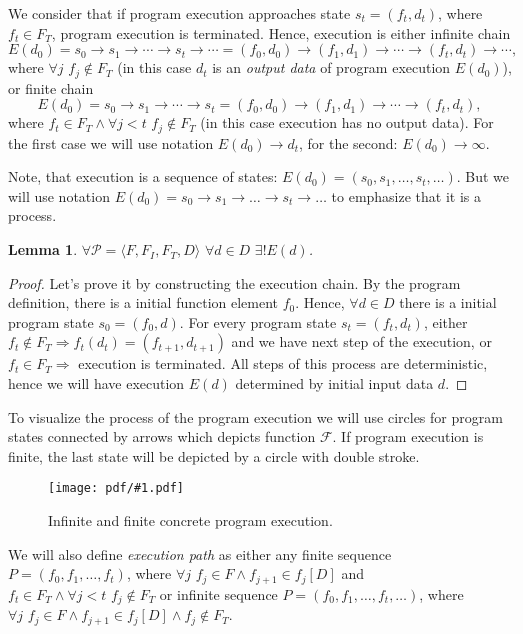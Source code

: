 \documentclass[oneside,a4paper]{article}  %
\newcommand{\Ra}{\Rightarrow}
\newcommand{\ra}{\rightarrow}
\newcommand{\term}[1]{\textit{#1}\index{#1}}
\newcommand{\centerimage}[2]{
\begin{figure}[h!]
    \begin{center}
        \texttt{[image: pdf/\#1.pdf]}
        \caption{#2}
    \end{center}
    \label{img:#1}
\end{figure}
}
\newtheorem{lemma}[theorem]{Lemma}
\begin{document}
We consider that if program execution approaches state $s_t = (f_t, d_t)$,
where $f_t \in F_T$, program execution is terminated.
Hence, execution is either infinite chain
\[E(d_0) = s_0 \ra s_1 \ra \cdots \ra s_t \ra \cdots =
        (f_0, d_0) \ra (f_1, d_1) \ra \cdots \ra (f_t, d_t) \ra \cdots,\]
where $\forall j \,\, f_j \notin F_T$ (in this case $d_t$ is an
\term{output data} of program execution $E(d_0)$),
or finite chain
\[E(d_0) = s_0 \ra s_1 \ra \cdots \ra s_t =
        (f_0, d_0) \ra (f_1, d_1) \ra \cdots \ra (f_t, d_t),\]
where $f_t \in F_T \land \forall j < t \,\, f_j \notin F_T$
(in this case execution has no output data).
For the first case we will use notation $E(d_0) \ra d_t$,
for the second: $E(d_0) \ra \infty$.

Note, that execution is a sequence of states:
$E(d_0) = (s_0, s_1, \dots, s_t, \dots)$.
But we will use notation
$E(d_0) = s_0 \ra s_1 \ra \dots \ra s_t \ra \dots$
to emphasize that it is a process.

\begin{lemma}
    \label{exists_one_execution}
    $\forall \mathcal{P} = \langle F, F_I, F_T, D \rangle \,\,
    \forall d \in D \,\, \exists! E(d)$.
\end{lemma}

\begin{proof}
    Let's prove it by constructing the execution chain.
    By the program definition, there is a initial function element $f_0$.
    Hence, $\forall d \in D$
    there is a initial program state $s_0 = (f_0, d)$.
    For every program state $s_t = (f_t, d_t)$,
    either $f_t \notin F_T \Ra f_t(d_t) = (f_{t + 1}, d_{t + 1})$
        and we have next step of the execution,
    or $f_t \in F_T \Ra$ execution is terminated.
    All steps of this process are deterministic,
    hence we will have execution $E(d)$ determined by initial input data $d$.
\end{proof}

To visualize the process of the program execution we will use circles
for program states connected by arrows which depicts function $\mathcal{F}$.
If program execution is finite, the last state will be depicted by
a circle with double stroke.

\centerimage{concrete_execution}
    {Infinite and finite concrete program execution.}

We will also define \term{execution path} as either any finite sequence
$P = (f_0, f_1, \dots, f_t)$, where
$\forall j \,\, f_j \in F \land f_{j + 1} \in f_j[D]$
and $f_t \in F_T \land \forall j < t \,\, f_j \notin F_T$
or infinite sequence $P = (f_0, f_1, \dots, f_t, \dots)$, where
$\forall j \,\, f_j \in F \land f_{j + 1} \in f_j[D] \land f_j \notin F_T$.
\end{document}
